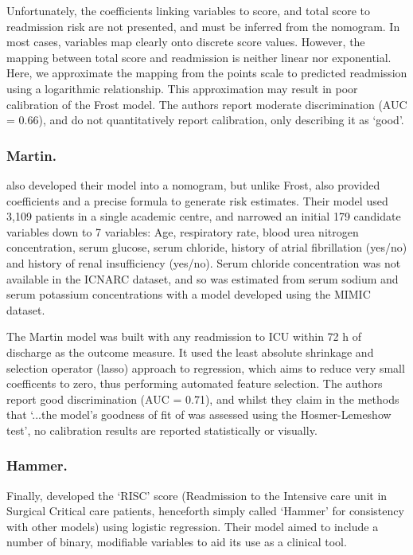 \documentclass[onecolumn]{article}
\begin{document}
Unfortunately, the coefficients linking variables to score, and total score to readmission risk are not presented, and must be inferred from the nomogram. In most cases, variables map clearly onto discrete score values. However, the mapping between total score and readmission is neither linear nor exponential. Here, we approximate the mapping from the points scale to predicted readmission using a logarithmic relationship. This approximation may result in poor calibration of the Frost model. The authors report moderate discrimination (AUC = 0.66), and do not quantitatively report calibration, only describing it as `good'.




\subsubsection*{Martin.}

\cite{Martin2018} also developed their model into a nomogram, but unlike Frost, also provided coefficients and a precise formula to generate risk estimates. Their model used 3,109 patients in a single academic centre, and narrowed an initial 179 candidate variables down to 7 variables: Age, respiratory rate, blood urea nitrogen concentration, serum glucose, serum chloride, history of atrial fibrillation (yes/no) and history of renal insufficiency (yes/no). Serum chloride concentration was not available in the ICNARC dataset, and so was estimated from serum sodium and serum potassium concentrations with a model developed using the MIMIC dataset.

The Martin model was built with any readmission to ICU within 72 h of discharge as the outcome measure. It used the least absolute shrinkage and selection operator (lasso) approach to regression, which aims to reduce very small coefficents to zero, thus performing automated feature selection. The authors report good discrimination (AUC = 0.71), and whilst they claim in the methods that `...the model's goodness of fit of was assessed using the Hosmer-Lemeshow test', no calibration results are reported statistically or visually.

\subsubsection*{Hammer.}

Finally, \cite{Hammer2020} developed the `RISC' score (Readmission to the Intensive care unit in Surgical Critical care patients, henceforth simply called `Hammer' for consistency with other models) using logistic regression. Their model aimed to include a number of binary, modifiable variables to aid its use as a clinical tool.
\end{document}
